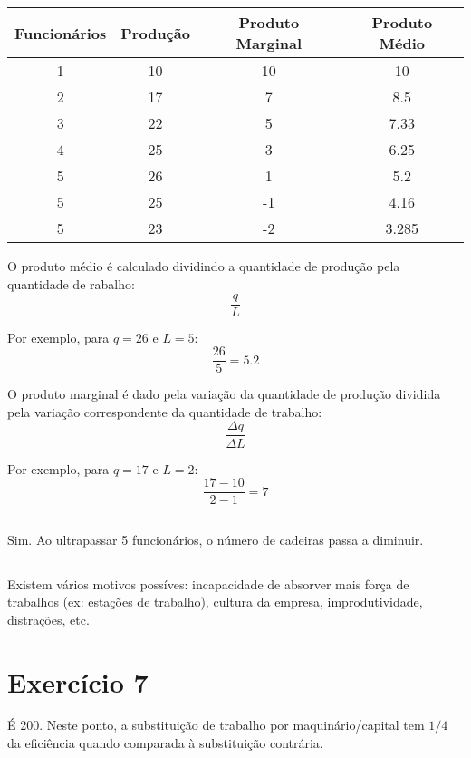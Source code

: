\documentclass{article}
\begin{document}
\subsection{}
\begin{center}
	\begin{tabular}{|c | c | c | c|}
		\hline
		Funcionários & Produção & Produto Marginal & Produto Médio \\
		\hline
		1            & 10       & 10               & 10            \\
		\hline
		2            & 17       & 7                & 8.5           \\
		\hline
		3            & 22       & 5                & 7.33          \\
		\hline
		4            & 25       & 3                & 6.25          \\
		\hline
		5            & 26       & 1                & 5.2           \\
		\hline
		5            & 25       & -1               & 4.16          \\
		\hline
		5            & 23       & -2               & 3.285         \\
		\hline
	\end{tabular}
\end{center}

O produto médio é calculado dividindo a quantidade de produção pela quantidade
de rabalho:
\[
    \frac{q}{L}
\]

Por exemplo, para \(q = 26\) e \(L=5\):
\[
    \frac{26}{5} = 5.2
\]

O produto marginal é dado pela variação da quantidade de produção dividida pela
variação correspondente da quantidade de trabalho:
\[
    \frac{\Delta q}{\Delta L}
\]

Por exemplo, para \(q = 17\) e \(L = 2\):
\[
    \frac{17-10}{2-1} = 7
\]

\subsection{}
Sim. Ao ultrapassar 5 funcionários, o número de cadeiras passa a diminuir.
\subsection{}
Existem vários motivos possíves: incapacidade de absorver mais força de
trabalhos (ex: estações de trabalho), cultura da empresa, improdutividade,
distrações, etc.

\section{Exercício 7}
É 200. Neste ponto, a substituição de trabalho por maquinário/capital tem
\(1/4\) da eficiência quando comparada à substituição contrária.
\end{document}
